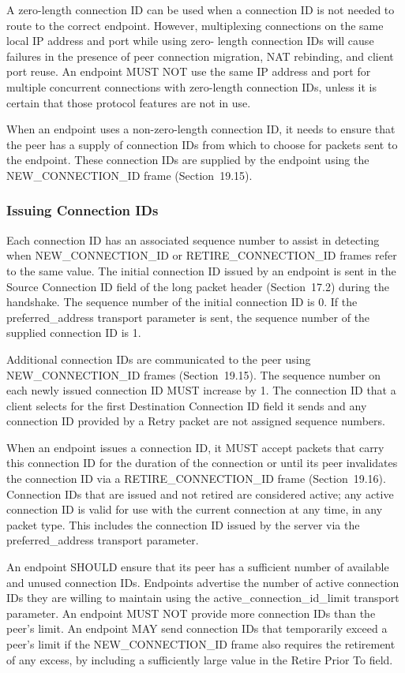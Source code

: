 \documentclass{article}
\begin{document}
A zero-length connection ID can be used when a connection ID is not needed to route to the correct endpoint.  However, multiplexing connections on the same local IP address and port while using zero- length connection IDs will cause failures in the presence of peer connection migration, NAT rebinding, and client port reuse.  An endpoint MUST NOT use the same IP address and port for multiple concurrent connections with zero-length connection IDs, unless it is certain that those protocol features are not in use.

When an endpoint uses a non-zero-length connection ID, it needs to ensure that the peer has a supply of connection IDs from which to choose for packets sent to the endpoint.  These connection IDs are supplied by the endpoint using the NEW\_CONNECTION\_ID frame (Section~19.15).

\subsubsection{Issuing Connection IDs}

Each connection ID has an associated sequence number to assist in detecting when NEW\_CONNECTION\_ID or RETIRE\_CONNECTION\_ID frames refer to the same value.  The initial connection ID issued by an endpoint is sent in the Source Connection ID field of the long packet header (Section~17.2) during the handshake.  The sequence number of the initial connection ID is 0.  If the preferred\_address transport parameter is sent, the sequence number of the supplied connection ID is 1.

Additional connection IDs are communicated to the peer using NEW\_CONNECTION\_ID frames (Section~19.15).  The sequence number on each newly issued connection ID MUST increase by 1.  The connection ID that a client selects for the first Destination Connection ID field it sends and any connection ID provided by a Retry packet are not assigned sequence numbers.

When an endpoint issues a connection ID, it MUST accept packets that carry this connection ID for the duration of the connection or until its peer invalidates the connection ID via a RETIRE\_CONNECTION\_ID frame (Section~19.16).  Connection IDs that are issued and not retired are considered active; any active connection ID is valid for use with the current connection at any time, in any packet type. This includes the connection ID issued by the server via the preferred\_address transport parameter.

An endpoint SHOULD ensure that its peer has a sufficient number of available and unused connection IDs.  Endpoints advertise the number of active connection IDs they are willing to maintain using the active\_connection\_id\_limit transport parameter.  An endpoint MUST NOT provide more connection IDs than the peer's limit.  An endpoint MAY send connection IDs that temporarily exceed a peer's limit if the NEW\_CONNECTION\_ID frame also requires the retirement of any excess, by including a sufficiently large value in the Retire Prior To field.
\end{document}
